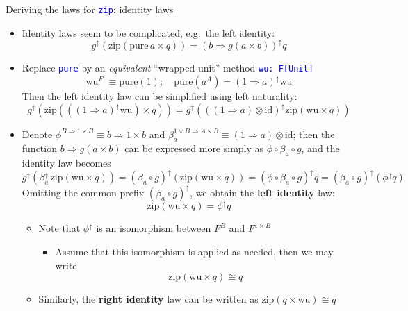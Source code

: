 \documentclass[english]{beamer}
\begin{document}
\begin{frame}{Deriving the laws for \texttt{\textcolor{blue}{\footnotesize{}zip}}:
identity laws}
\begin{itemize}
\item \vspace{-0.2cm}Identity laws seem to be complicated, e.g.\ the left
identity:{\footnotesize{}
\[
g^{\uparrow}\left(\text{zip}\left(\text{pure}\,a\times q\right)\right)=\left(b\Rightarrow g\left(a\times b\right)\right)^{\uparrow}q
\]
}{\footnotesize \par}
\item Replace \texttt{\textcolor{blue}{\footnotesize{}pure}} by an \emph{equivalent}
``wrapped unit'' method \texttt{\textcolor{blue}{\footnotesize{}wu:\ F{[}Unit{]}}}{\footnotesize{}
\[
\text{wu}^{F^{1}}\equiv\text{pure}\left(1\right);\quad\text{pure}(a^{A})=\left(1\Rightarrow a\right)^{\uparrow}\text{wu}
\]
}Then the left identity law can be simplified using left naturality:{\footnotesize{}
\[
g^{\uparrow}\left(\text{zip}\left((\left(1\Rightarrow a\right)^{\uparrow}\text{wu})\times q\right)\right)=g^{\uparrow}\left(\left((1\Rightarrow a)\otimes\text{id}\right)^{\uparrow}\text{zip}\left(\text{wu}\times q\right)\right)
\]
}{\footnotesize \par}
\item Denote {\footnotesize{}$\phi^{B\Rightarrow1\times B}\equiv b\Rightarrow1\times b$}
and {\footnotesize{}$\beta_{a}^{1\times B\Rightarrow A\times B}\equiv\left(1\Rightarrow a\right)\otimes\text{id}$};
then the function {\footnotesize{}$b\Rightarrow g\left(a\times b\right)$}
can be expressed more simply as {\footnotesize{}$\phi\circ\beta_{a}\circ g$},
and the identity law becomes{\footnotesize{}
\[
g^{\uparrow}(\beta_{a}^{\uparrow}\,\text{zip}\left(\text{wu}\times q\right))=\left(\beta_{a}\circ g\right)^{\uparrow}\left(\text{zip}\left(\text{wu}\times q\right)\right)=\left(\phi\circ\beta_{a}\circ g\right)^{\uparrow}q=\left(\beta_{a}\circ g\right)^{\uparrow}(\phi^{\uparrow}q)
\]
}Omitting the common prefix {\footnotesize{}$\left(\beta_{a}\circ g\right)^{\uparrow}$},
we obtain the \textbf{left identity} law:{\footnotesize{}
\[
\text{zip}\left(\text{wu}\times q\right)=\phi^{\uparrow}q
\]
}{\footnotesize \par}
\begin{itemize}
\item Note that $\phi^{\uparrow}$ is an isomorphism between $F^{B}$ and
$F^{1\times B}$
\begin{itemize}
\item Assume that this isomorphism is applied as needed, then we may write{\footnotesize{}
\[
\text{zip}\left(\text{wu}\times q\right)\cong q
\]
}{\footnotesize \par}
\end{itemize}
\item Similarly, the \textbf{right identity} law can be written as {\footnotesize{}$\text{zip}\left(q\times\text{wu}\right)\cong q$}{\footnotesize \par}
\end{itemize}
\end{itemize}
\end{frame}
\end{document}
